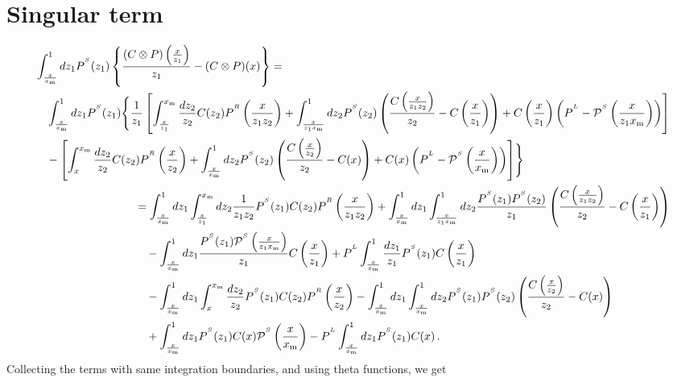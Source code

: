 \documentclass[a4paper]{article}
\newcommand{\PR}[0]{P^{^R}}
\newcommand{\PS}[0]{P^{^S}}
\newcommand{\PmS}[0]{\mathcal{P}^{^S}}
\newcommand{\PL}[0]{P^{^L}}
\newcommand{\xm}[0]{x_{\rm m}}
\newcommand{\zo}[0]{{z_1}}
\newcommand{\zt}[0]{{z_2}}
\begin{document}
\section{Singular term}

\begin{align}
	\begin{split}
		&  \int_{\frac{x}{\xm}}^1dz_1 \PS(z_1) \left\{ \frac{(C \otimes P)\left(\frac{x}{z_1}\right)}{z_1} - (C \otimes P)(x)\right\} = \\
		& \quad\int_{\frac{x}{\xm}}^1d\zo \PS(\zo) \Biggl\{\frac{1}{\zo}\left[\int_{\frac{x}{\zo}}^{\xm}\frac{d\zt}{\zt}C(\zt)\PR\left(\frac{x}{\zo \zt}\right) + \int_{\frac{x}{\zo \xm}}^1d\zt \PS(\zt)\left(\frac{C\left(\frac{x}{\zo \zt}\right)}{\zt}-C\left(\frac{x}{\zo}\right)\right) + C\left(\frac{x}{\zo}\right)\left(\PL - \PmS\left(\frac{x}{\zo \xm}\right)\right) \right] \\
		&\quad- \left[\int_x^{\xm}\frac{d\zt}{\zt} C(\zt) \PR\left(\frac{x}{\zt}\right) + \int_\frac{x}{\xm}^1 d\zt \PS(\zt)\left(\frac{C\left(\frac{x}{\zt}\right)}{\zt}-C(x)\right) + C(x)\left(\PL - \PmS\left(\frac{x}{\xm}\right)\right) \right] \Biggr\} \\
	\end{split} \notag \\
	\begin{split}
		&=\int_{\frac{x}{\xm}}^1d\zo \int_\frac{x}{\zo}^{\xm}d\zt \frac{1}{\zo \zt} \PS(\zo) C(\zt) \PR\left(\frac{x}{\zo \zt}\right) + \int_{\frac{x}{\xm}}^1d\zo \int_\frac{x}{\zo \xm}^1d\zt \frac{\PS(\zo)\PS(\zt)}{\zo}\left(\frac{C\left(\frac{x}{\zo \zt}\right)}{\zt}-C\left(\frac{x}{\zo}\right)\right) \\
		&\quad-\int_\frac{x}{\xm}^1d\zo \frac{ \PS(\zo)\PmS\left(\frac{x}{\zo \xm}\right) }{\zo} C\left(\frac{x}{\zo}\right) + \PL \int_\frac{x}{\xm}^1\frac{d\zo}{\zo}\PS(\zo)C\left(\frac{x}{\zo}\right) \\
		&\quad- \int_\frac{x}{\xm}^1d\zo \int_x^{\xm}\frac{d\zt}{\zt} \PS(\zo) C(\zt) \PR\left(\frac{x}{\zt}\right)  - \int_\frac{x}{\xm}^1 d\zo \int_\frac{x}{\xm}^1 d\zt \PS(\zo) \PS(\zt) \left(\frac{C\left(\frac{x}{\zt}\right)}{\zt}-C(x)\right) \\
		&\quad+ \int_\frac{x}{\xm}^1 d \zo\PS(\zo) C(x)  \PmS\left(\frac{x}{\xm}\right) - \PL \int_\frac{x}{\xm}^1 d\zo \PS(\zo) C(x)\,.
\end{split}
\end{align}
Collecting the terms with same integration boundaries, and using theta functions, we get
\end{document}
